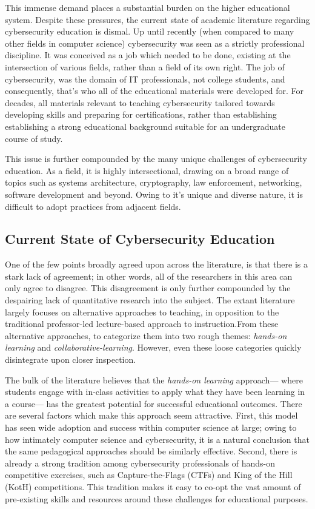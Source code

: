 \documentclass{article}
\begin{document}
    This immense demand places a substantial burden on the higher educational system. %
Despite these pressures, the current state of academic literature regarding cybersecurity education is dismal. Up until recently (when compared to many other fields in computer science) cybersecurity was seen as a strictly professional discipline. %
It was conceived as a job which needed to be done, existing at the intersection of various fields, rather than a field of its own right. %
The job of cybersecurity, was the domain of IT professionals, not college students, and consequently, that's who all of the educational materials were developed for. %
For decades, all materials relevant to teaching cybersecurity tailored towards developing skills and preparing for certifications, rather than establishing establishing a strong educational background suitable for an undergraduate course of study. 
    
        This issue is further compounded by the many unique challenges of cybersecurity education. %
As a  field, it is highly intersectional, drawing on a broad range of topics such as systems architecture, cryptography, law enforcement, networking, software development and beyond. %
Owing to it's unique and diverse nature, it is difficult to adopt practices from adjacent fields. 

    \subsection{Current State of Cybersecurity Education} 
    One of the few points broadly agreed upon across the literature, is that there is a stark lack of agreement; %
in other words, all of the researchers in this area can only agree to disagree. %
This disagreement is only further compounded by the despairing lack of quantitative research into the subject. %
The extant literature largely focuses on alternative approaches to teaching, in opposition to the traditional professor-led lecture-based approach to instruction.From these alternative approaches, to categorize them into two rough themes: \emph{hands-on learning} and \emph{collaborative-learning}. %
However, even these loose categories quickly disintegrate upon closer inspection. 

    The bulk of the literature believes that the \emph{hands-on learning} approach---%
where students engage with in-class activities to apply what they have been learning in a course---%
has the greatest potential for successful educational outcomes. %
There are several factors which make this approach seem attractive. %
First, this model has seen wide adoption and success within computer science at large; %
owing to how intimately computer science and cybersecurity, it is a natural conclusion that the same pedagogical approaches should be similarly effective. %
Second, there is already a strong tradition among cybersecurity professionals of hands-on competitive exercises, such as Capture-the-Flags (CTFs) and King of the Hill (KotH) competitions. %
This tradition makes it easy to co-opt the vast amount of pre-existing skills and resources around these challenges for educational purposes. 
\end{document}
